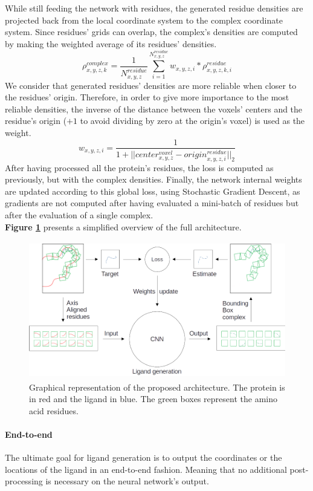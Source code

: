 \documentclass{article}
\begin{document}
While still feeding the network with residues, the generated residue densities are projected back from the local coordinate system to the complex coordinate system. Since residues' grids can overlap, the complex's densities are computed by making the weighted average of its residues' densities.
$$
\rho_{x,y,z,k}^{complex} = \frac{1}{N_{x,y,z}^{residue}} \sum_{i=1}^{N_{x,y,z}^{residue}} w_{x,y,z,i} * \rho_{x,y,z,k,i}^{residue}
$$
We consider that generated residues' densities are more reliable when closer to the residues' origin. Therefore, in order to give more importance to the most reliable densities, the inverse of the distance between the voxels' centers and the residue's origin ($+1$ to avoid dividing by zero at the origin's voxel) is used as the weight.
$$
w_{x,y,z,i} = \frac{1}{1+||center_{x,y,z}^{voxel} - origin_{x,y,z,i}^{residue}||_2}
$$
After having processed all the protein's residues, the loss is computed as previously, but with the complex densities. Finally, the network internal weights are updated according to this global loss, using Stochastic Gradient Descent, as gradients are not computed after having evaluated a mini-batch of residues but after the evaluation of a single complex. \\
\textbf{Figure \ref{fig:arch}} presents a simplified overview of the full architecture.
\begin{figure}[H]
    \centering
    \includegraphics[height=6cm,width=\textwidth,keepaspectratio]{arch.png}
    \caption{Graphical representation of the proposed architecture. The protein is in red and the ligand in blue. The green boxes represent the amino acid residues.}
    \label{fig:arch}
\end{figure}

\paragraph{End-to-end}

The ultimate goal for ligand generation is to output the coordinates or the locations of the ligand in an end-to-end fashion. Meaning that no additional post-processing is necessary on the neural network's output. \\
\end{document}
